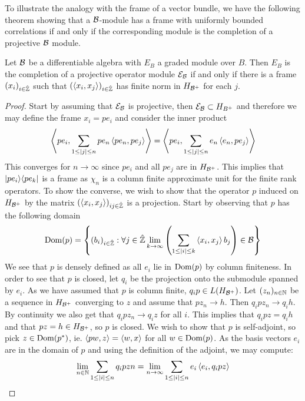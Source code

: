 To illustrate the analogy with the frame of a vector bundle, we have the following theorem showing that a $\mathcal{B}$-module has a frame with uniformly bounded correlations if and only if the corresponding \Cstar module is the completion of a projective $\mathcal{B}$ module. 
\begin{proposition}\label{columnfin}
	Let $\mathcal{B}$ be a differentiable algebra with $E_B$ a graded \Cstar module over $B$. Then $E_B$ is the completion of a projective operator module $\mathcal{E}_{\mathcal{B}}$ if and only if there is a frame $(x_i)_{i\in \hat{\mathbb{Z}}}$ such that $(\left \langle x_i,x_j \right \rangle)_{i \in \hat{\mathbb{Z}}}$ has finite norm in $H_{\mathcal{B}^+}$ for each $j$. 
\end{proposition}
\begin{proof}
	Start by assuming that $\mathcal{E}_{\mathcal{B}}$ is projective, then $\mathcal{E}_{\mathcal{B}}\subset H_{B^+}$ and therefore we may define the frame $x_i=pe_i$ and consider the inner product
	\begin{align*}
		\left \langle pe_i,\sum_{1\leq |j|\leq n} pe_n\left \langle pe_n,pe_j \right \rangle \right \rangle=\left \langle pe_i,\sum_{1\leq |j|\leq n} e_n\left \langle e_n,pe_j \right \rangle \right \rangle
	\end{align*}
	This converges for $n\to \infty$ since $pe_i$ and all $pe_j$ are in $H_{\mathcal{B}^+}$. This implies that $\lvert pe_i \rangle\langle pe_k \rvert$ is a frame as $\chi_n$ is a column finite approximate unit for the finite rank operators. 
	To show the converse, we wish to show that the operator $p$ induced on $H_{\mathcal{B}^+}$ by the matrix $(\left \langle x_i,x_j \right \rangle)_{ij\in \hat{\mathbb{Z}}}$ is a projection. Start by observing that $p$ has the following domain 
	\begin{align*}
		\operatorname{Dom}(p)=\left \{(b_i)_{i\in \hat{\mathbb{Z}}} : \forall j \in \hat{\mathbb{Z}} \lim_{k\to \infty} \left ( \sum_{1\leq |i|\leq k} \left \langle x_i,x_j \right \rangle b_j \right )\in \mathcal{B} \right \}
	\end{align*}
	We see that $p$ is densely defined as all $e_i$ lie in $\operatorname{Dom}(p)$ by column finiteness. In order to see that $p$ is closed, let $q_i$ be the projection onto the submodule spanned by $e_i$. As we have assumed that $p$ is column finite, $q_ip\in L(H_{\mathcal{B}^+})$. Let $(z_n)_{n\in \mathbb{N}}$ be a sequence in $H_{\mathcal{B}^+}$ converging to $z$ and assume that $pz_n\to h$. Then $q_ipz_n\to q_ih$. By continuity we also get that $q_ipz_n\to q_iz$ for all $i$.
	This implies that $q_ipz=q_ih$ and that $pz=h\in H_{\mathcal{B}^+}$, so $p$ is closed. 
	We wish to show that $p$ is self-adjoint, so pick $z\in \operatorname{Dom} (p^*)$, ie. $\left \langle pw,z \right \rangle=\left \langle w,x \right \rangle$ for all $w\in \operatorname{Dom} (p)$. As the basis vectors $e_i$ are in the domain of $p$ and using the definition of the adjoint, we may compute:
	\begin{align*}
		\lim_{n\in \N} \sum_{1\leq |i|\leq n} q_ipzn&=\lim_{n\to \infty} \sum_{1\leq |i|\leq n} e_i \ip{e_i}{q_ipz} \\

\end{align*}
\end{proof}
